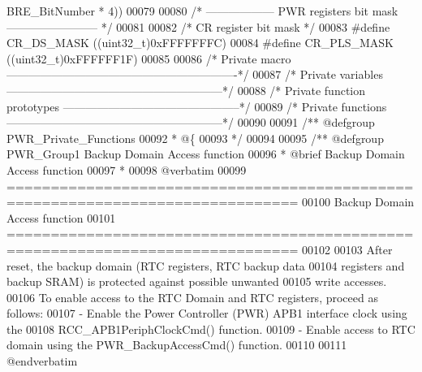 \begin{DoxyCode}
      BRE_BitNumber \textcolor{preprocessor}{*} 4\textcolor{preprocessor}{)}\textcolor{preprocessor}{)}
00079 
00080 \textcolor{comment}{/* ------------------ PWR registers bit mask ------------------------ */}
00081 
00082 \textcolor{comment}{/* CR register bit mask */}
00083 \textcolor{preprocessor}{#}\textcolor{preprocessor}{define} \textcolor{preprocessor}{CR\_DS\_MASK}               \textcolor{preprocessor}{(}\textcolor{preprocessor}{(}\textcolor{preprocessor}{uint32\_t}\textcolor{preprocessor}{)}0xFFFFFFFC\textcolor{preprocessor}{)}
00084 \textcolor{preprocessor}{#}\textcolor{preprocessor}{define} \textcolor{preprocessor}{CR\_PLS\_MASK}              \textcolor{preprocessor}{(}\textcolor{preprocessor}{(}\textcolor{preprocessor}{uint32\_t}\textcolor{preprocessor}{)}0xFFFFFF1F\textcolor{preprocessor}{)}
00085 
00086 \textcolor{comment}{/* Private macro -------------------------------------------------------------*/}
00087 \textcolor{comment}{/* Private variables ---------------------------------------------------------*/}
00088 \textcolor{comment}{/* Private function prototypes -----------------------------------------------*/}
00089 \textcolor{comment}{/* Private functions ---------------------------------------------------------*/}
00090 
00091 \textcolor{comment}{/** @defgroup PWR\_Private\_Functions}
00092 \textcolor{comment}{  * @\{}
00093 \textcolor{comment}{  */}
00094 
00095 \textcolor{comment}{/** @defgroup PWR\_Group1 Backup Domain Access function }
00096 \textcolor{comment}{ *  @brief   Backup Domain Access function  }
00097 \textcolor{comment}{ *}
00098 \textcolor{comment}{@verbatim   }
00099 \textcolor{comment}{ ===============================================================================}
00100 \textcolor{comment}{                            Backup Domain Access function }
00101 \textcolor{comment}{ ===============================================================================  }
00102 \textcolor{comment}{}
00103 \textcolor{comment}{  After reset, the backup domain (RTC registers, RTC backup data }
00104 \textcolor{comment}{  registers and backup SRAM) is protected against possible unwanted }
00105 \textcolor{comment}{  write accesses. }
00106 \textcolor{comment}{  To enable access to the RTC Domain and RTC registers, proceed as follows:}
00107 \textcolor{comment}{    - Enable the Power Controller (PWR) APB1 interface clock using the}
00108 \textcolor{comment}{      RCC\_APB1PeriphClockCmd() function.}
00109 \textcolor{comment}{    - Enable access to RTC domain using the PWR\_BackupAccessCmd() function.}
00110 \textcolor{comment}{}
00111 \textcolor{comment}{@endverbatim}

\end{DoxyCode}
